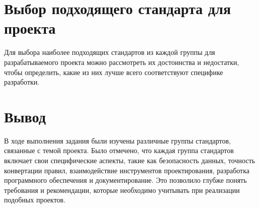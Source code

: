 




\clearpage

\section{Выбор подходящего стандарта для проекта}

Для выбора наиболее подходящих стандартов из каждой группы
для разрабатываемого проекта можно рассмотреть их достоинства и недостатки,
чтобы определить, какие из них лучше всего соответствуют специфике разработки.







\clearpage

\section*{\LARGE Вывод}

В ходе выполнения задания были изучены различные группы стандартов,
связанные с темой проекта.
Было отмечено, что каждая группа стандартов включает
свои специфические аспекты,
такие как безопасность данных, точность конвертации правил,
взаимодействие инструментов проектирования,
разработка программного обеспечения и документирование.
Это позволило глубже понять требования и рекомендации,
которые необходимо учитывать при реализации подобных проектов.

